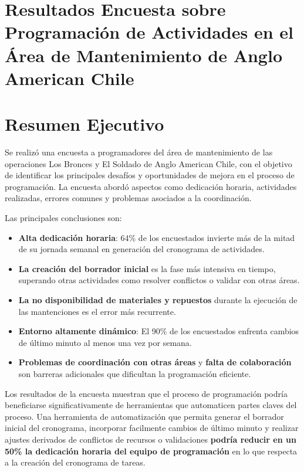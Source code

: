 \documentclass{article}
\begin{document}
\begin{appendix}
    \section{Resultados Encuesta sobre Programación de Actividades en el Área de Mantenimiento de Anglo American Chile}
    \section*{Resumen Ejecutivo}

    Se realizó una encuesta a programadores del área de mantenimiento de las operaciones Los Bronces y El Soldado de Anglo American Chile, con el objetivo de identificar los principales desafíos y oportunidades de mejora en el proceso de programación. La encuesta abordó aspectos como dedicación horaria, actividades realizadas, errores comunes y problemas asociados a la coordinación.
    
    Las principales conclusiones son:
    
    \begin{itemize}
        \item \textbf{Alta dedicación horaria}: 64\% de los encuestados invierte más de la mitad de su jornada semanal en generación del cronograma de actividades.
        \item \textbf{La creación del borrador inicial} es la fase más intensiva en tiempo, superando otras actividades como resolver conflictos o validar con otras áreas.
        \item \textbf{La no disponibilidad de materiales y repuestos} durante la ejecución de las mantenciones es el error más recurrente.
        \item \textbf{Entorno altamente dinámico}: El 90\% de los encuestados enfrenta cambios de último minuto al menos una vez por semana.
        \item \textbf{Problemas de coordinación con otras áreas} y \textbf{falta de colaboración} son barreras adicionales que dificultan la programación eficiente.
    \end{itemize}
    
    Los resultados de la encuesta muestran que el proceso de programación podría beneficiarse significativamente de herramientas que automaticen partes claves del proceso. Una herramienta de automatización que permita generar el borrador inicial del cronograma, incorporar facilmente cambios de último minuto y realizar ajustes derivados de conflictos de recursos o validaciones \textbf{podría reducir en un 50\% la dedicación horaria del equipo de programación} en lo que respecta a la creación del cronograma de tareas. 
    

\end{appendix}
\end{document}

